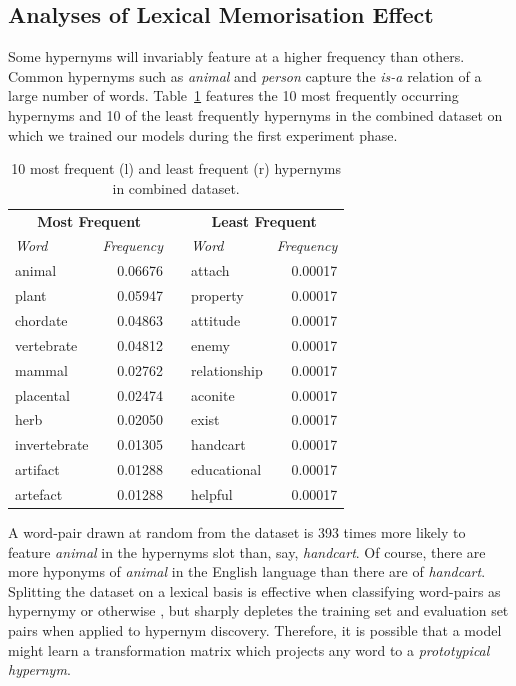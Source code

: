 \subsection{Analyses of Lexical Memorisation Effect}
Some hypernyms will invariably feature at a higher frequency than others.  Common hypernyms such as \textit{animal} and \textit{person} capture the \textit{is-a} relation of a large number of words.  Table~\ref{tab:high_freq_hyper_combined_set} features the 10 most frequently occurring hypernyms and 10 of the least frequently hypernyms in the combined dataset on which we trained our models during the first experiment phase.
\begin{table}\centering
    \begin{tabular}{@{}lrclr@{}} \toprule
    \multicolumn{2}{c}{\textbf{Most Frequent}} & \phantom{a} & \multicolumn{2}{c}{\textbf{Least Frequent}}\\
    \textit{Word} & \textit{Frequency} && \textit{Word} & \textit{Frequency} \\ 
    \cmidrule{1-2} \cmidrule{4-5}
    animal & 0.06676 && attach & 0.00017 \\
    plant & 0.05947 && property & 0.00017\\
    chordate & 0.04863 && attitude & 0.00017\\
    vertebrate & 0.04812 && enemy & 0.00017\\
    mammal & 0.02762 && relationship & 0.00017\\
    placental & 0.02474 && aconite & 0.00017\\
    herb & 0.02050 && exist & 0.00017\\
    invertebrate & 0.01305 && handcart & 0.00017\\
    artifact & 0.01288 && educational & 0.00017\\
    artefact & 0.01288 && helpful & 0.00017\\
    \bottomrule
    \end{tabular}
    \caption{10 most frequent (l) and least frequent (r) hypernyms in combined dataset.}\label{tab:high_freq_hyper_combined_set}
\end{table}
A word-pair drawn at random from the dataset is 393 times more likely to feature \textit{animal} in the hypernyms slot than, say, \textit{handcart}.  Of course, there are more hyponyms of \textit{animal} in the English language than there are of \textit{handcart}.  Splitting the dataset on a lexical basis is effective when classifying word-pairs as hypernymy or otherwise \citep{shwartz2017siege, levy2015supervised, santus2016nine}, but sharply depletes the training set and evaluation set pairs when applied to hypernym discovery.  Therefore, it is possible that a model might learn a transformation matrix which projects any word to a \textit{prototypical hypernym}.

